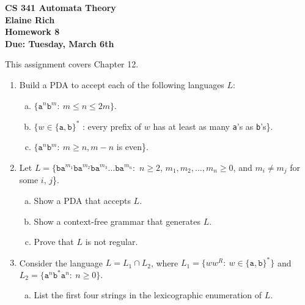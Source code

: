 \documentclass[10pt]{article}
\begin{document}
\begin{center}
\textbf{
CS 341 Automata Theory \\
Elaine Rich \\
Homework 8 \\
Due: Tuesday, March 6th}\\
\end{center}
\noindent
This assignment covers Chapter 12. \\

\begin{enumerate}[1)]


\item
Build a PDA to accept each of the following languages $L$:
\begin{enumerate}[a)]
\item
$\{\texttt{a}^n\texttt{b}^m:\ m \leq n \leq 2m\}$.

\item
$\{w \in \{\texttt{a}, \texttt{b}\}^*$ : every prefix of $w$ has at least as many \texttt{a}'s as \texttt{b}'s\}.

\item
$\{\texttt{a}^n\texttt{b}^m:\ m \geq n, m-n$ is even\}.
\end{enumerate}


\item
Let $L = \{\texttt{ba}^{m_1}\texttt{ba}^{m_2}\texttt{ba}^{m_3} \ldots \texttt{ba}^{m_n}:$ $n \geq 2$, $m_1, m_2, \ldots, m_n \geq 0$, and $m_i \neq m_j$ for some $i$, $j$\}.
\begin{enumerate}[a)]
\item
Show a PDA that accepts $L$.

\item
Show a context-free grammar that generates $L$.

\item
Prove that $L$ is not regular.
\end{enumerate}


\item
Consider the language $L = L_1 \cap L_2$, where $L_1 = \{ww^R:\ w \in \{\texttt{a}, \texttt{b}\}^*\}$ and $L_2 = \{\texttt{a}^n\texttt{b}^*\texttt{a}^n:\ n \geq 0\}$.
\begin{enumerate}[a)]
\item
List the first four strings in the lexicographic enumeration of $L$.


\end{enumerate}
\end{enumerate}
\end{document}

